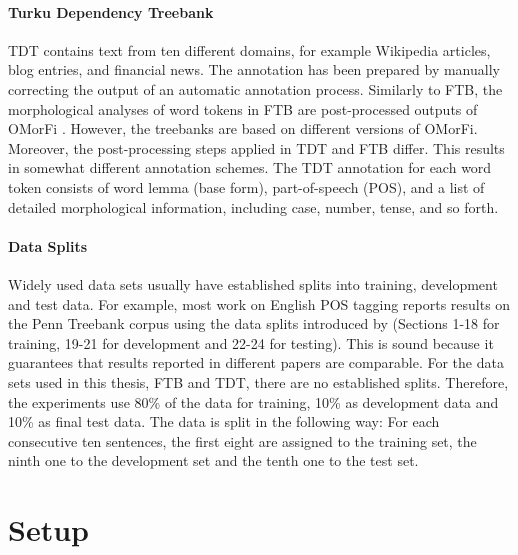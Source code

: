 \paragraph{Turku Dependency Treebank} TDT contains text from ten different domains, for example Wikipedia articles, blog entries, and financial news. The annotation has been prepared by manually correcting the output of an automatic annotation process.
Similarly to FTB, the morphological analyses of word tokens in FTB are
post-processed outputs of OMorFi \citep{Pirinen2011}. However, the
treebanks are based on different versions of OMorFi. Moreover, the
post-processing steps applied in TDT and FTB differ. This results in
somewhat different annotation schemes.  The TDT annotation for each
word token consists of word lemma (base form), part-of-speech (POS),
and a list of detailed morphological information, including case,
number, tense, and so forth.

\paragraph{Data Splits} Widely used data sets usually have established
splits into training, development and test data. For example, most
work on English POS tagging reports results on the Penn Treebank
corpus \citep{Marcus1993} using the data splits introduced by
\cite{Collins2002} (Sections 1-18 for training, 19-21 for development
and 22-24 for testing). This is sound because it guarantees that
results reported in different papers are comparable. For the data sets
used in this thesis, FTB and TDT, there are no established
splits. Therefore, the experiments use 80\% of the data for training,
10\% as development data and 10\% as final test data. The data is
split in the following way: For each consecutive ten sentences, the
first eight are assigned to the training set, the ninth one to the
development set and the tenth one to the test set.

\section{Setup}


